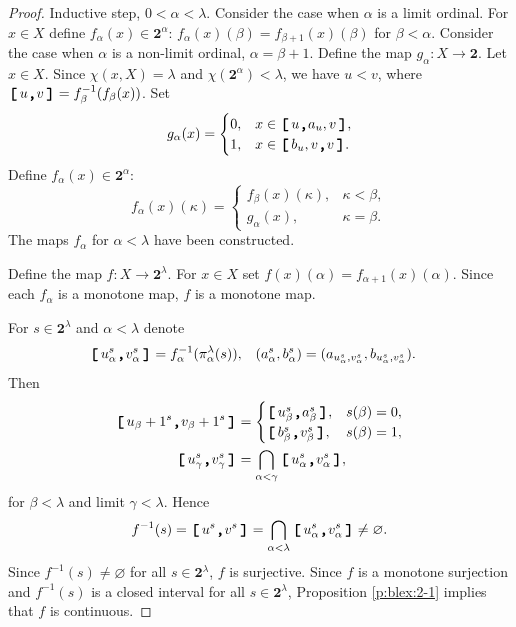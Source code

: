 \documentclass[preprint]{elsarticle}
\def\be{\beta}
\def\al{\alpha}
\def\ga{\gamma}
\def\la{\lambda}
\def\ka{\kappa}
\def\es{\varnothing}
\theoremstyle{definition}
\theoremstyle{remark}
\def\lex#1#2{\mathfrak{L}(#2^{#1})}
\def\lex#1#2{#2^{#1}}
\def\B{2}
\def\B{\mathsf{2}}
\def\B{\mathbf{2}}
\def\ilcomma/{\boldsymbol{,}}
\def\ilsymlc{\boldsymbol{[}}
\def\ilsymrc{\boldsymbol{]}}
\def\ilfont#1{\boldsymbol{#1}}
\def\ilfontX#1{\mathrm{\text{\texttt{\textbf{\large #1}}}}}
\def\ilfontX#1{{\text{\texttt{\textbf{\large \upshape #1}}}}}
\def\ilfont#1{\raisebox{-1.2pt}{\ilfontX{#1}}}
\def\ilfontC#1{\raisebox{-0.7pt}{\ilfontX{#1}}}
\def\ilcomma/{\ilfontC{,}}
\def\ilsymlc{\ilfont{[}\,}
\def\ilsymrc{\,\ilfont{]}}
\def\ilcc[#1,#2]{\ilsymlc#1\ilcomma/ #2\ilsymrc}
\def\lexab{\lex\la\B}
\begin{document}
\begin{proof}
Inductive step, $0<\al<\la$. Consider the case when $\al$ is a limit ordinal. For $x\in X$ define $f_\al(x)\in \B^\al$: $f_\al(x)(\be)=f_{\be+1}(x)(\be)$ for $\be<\al$. Consider the case when $\al$ is a non-limit ordinal, $\al=\be+1$.
Define the map $g_\al: X\to \B$. Let $x\in X$. Since $\chi(x,X)=\la$ and $\chi(\B^\al)<\la$, we have $u<v$, where $\ilcc[u,v]=f^{-1}_\be(f_\be(x))$. Set
\[
g_\al(x) = \begin{cases}
0,&	x\in \ilcc[u,a_{u,v}],
\\
1,&	x\in \ilcc[b_{u,v},v].
\end{cases}
\]
Define $f_\al(x)\in \B^\al$:
\[
f_\al(x)(\ka) = \begin{cases}
f_\be(x)(\ka),&	\ka<\be,
\\
g_\al(x),&	\ka=\be.
\end{cases}
\]
The maps $f_\al$ for $\al<\la$ have been constructed.

Define the map $f: X\to \lexab$. For $x\in X$ set $f(x)(\al)=f_{\al+1}(x)(\al)$.
Since each $f_\al$ is a monotone map, $f$ is a monotone map.

For $s\in \lexab$ and $\al<\la$ denote 
\begin{align*}
\ilcc[u_\al^s,v_\al^s]&=f^{-1}_\al(\pi_\al^\la(s)), 
&
(a_\al^s,b_\al^s)&=(a_{u_\al^s,v_\al^s},b_{u_\al^s,v_\al^s}).
\end{align*}
Then
\begin{align*}
\ilcc[u_{\be+1}^s,v_{\be+1}^s] &=
\begin{cases}
\ilcc[u_{\be}^s,a_{\be}^s], &  s(\be)=0,
\\
\ilcc[b_{\be}^s,v_{\be}^s], &  s(\be)=1,
\end{cases}
\\
\ilcc[u_{\ga}^s,v_{\ga}^s] &= \bigcap_{\al<\ga}\ilcc[u_\al^s,v_\al^s],
\end{align*}
for $\be<\la$ and limit $\ga<\la$. Hence 
\[
f^{-1}(s) = \ilcc[u^s,v^s]=\bigcap_{\al<\la}\ilcc[u_\al^s,v_\al^s]\neq\es.
\]
Since $f^{-1}(s)\neq\es$ for all $s\in\lexab$, $f$ is surjective.
Since $f$ is a monotone surjection and $f^{-1}(s)$ is a closed interval for all $s\in\lexab$, Proposition \ref{p:blex:2-1} implies that $f$ is continuous.


\end{proof}
\end{document}
